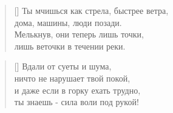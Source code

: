 \documentclass[a5paper,11pt]{memoir}
\begin{document}
\BgThispage

\clearpage

\begin{verse}[\versewidth]
Ты мчишься как стрела, быстрее ветра,\\
дома, машины, люди позади.\\
Мелькнув, они теперь лишь точки,\\
лишь веточки в течении реки.
\end{verse}

\begin{verse}[\versewidth]
Вдали от суеты и шума,\\
ничто не нарушает твой покой,\\
и даже если в горку ехать трудно,\\
ты знаешь - сила воли под рукой!
\end{verse}
\end{document}
